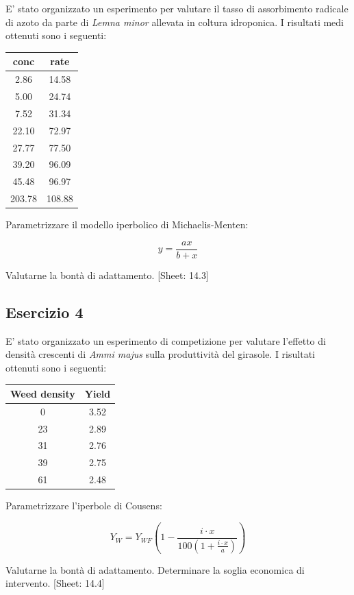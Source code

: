 \documentclass[a4paper,12pt,oneside]{book}
\begin{document}
E' stato organizzato un esperimento per valutare il tasso di assorbimento radicale di azoto da parte di \emph{Lemna minor} allevata in coltura idroponica. I risultati medi ottenuti sono i seguenti:

\begin{longtable}[]{@{}cc@{}}
\toprule()
conc & rate \\
\midrule()
\endhead
2.86 & 14.58 \\
5.00 & 24.74 \\
7.52 & 31.34 \\
22.10 & 72.97 \\
27.77 & 77.50 \\
39.20 & 96.09 \\
45.48 & 96.97 \\
203.78 & 108.88 \\
\bottomrule()
\end{longtable}

Parametrizzare il modello iperbolico di Michaelis-Menten:

\[y = \frac{a x} {b + x}\]

Valutarne la bontà di adattamento.
{[}Sheet: 14.3{]}

\hypertarget{esercizio-4-7}{%
\subsection{Esercizio 4}\label{esercizio-4-7}}

E' stato organizzato un esperimento di competizione per valutare l'effetto di densità crescenti di \emph{Ammi majus} sulla produttività del girasole. I risultati ottenuti sono i seguenti:

\begin{longtable}[]{@{}cc@{}}
\toprule()
Weed density & Yield \\
\midrule()
\endhead
0 & 3.52 \\
23 & 2.89 \\
31 & 2.76 \\
39 & 2.75 \\
61 & 2.48 \\
\bottomrule()
\end{longtable}

Parametrizzare l'iperbole di Cousens:

\[Y_W  = Y_{WF} \left( 1 - \frac{i \cdot x}{100\left( 1 + \frac{i \cdot x}{a} \right)} \right)\]

Valutarne la bontà di adattamento. Determinare la soglia economica di intervento.
{[}Sheet: 14.4{]}
\end{document}
